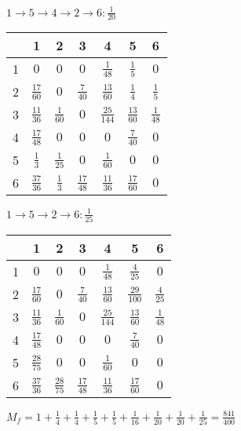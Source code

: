 \documentclass[russian]{article}
\begin{document}
$ 1 \to 5 \to 4 \to 2 \to 6 : \frac{1}{20}$

\begin{tabular}{|c|c|c|c|c|c|c|}\hline
& 1& 2& 3& 4& 5& 6\\\hline
1& $0$& $0$& $0$& $\frac{1}{48}$& $\frac{1}{5}$& $0$\\\hline
2& $\frac{17}{60}$& $0$& $\frac{7}{40}$& $\frac{13}{60}$& $\frac{1}{4}$& $\frac{1}{5}$\\\hline
3& $\frac{11}{36}$& $\frac{1}{60}$& $0$& $\frac{25}{144}$& $\frac{13}{60}$& $\frac{1}{48}$\\\hline
4& $\frac{17}{48}$& $0$& $0$& $0$& $\frac{7}{40}$& $0$\\\hline
5& $\frac{1}{3}$& $\frac{1}{25}$& $0$& $\frac{1}{60}$& $0$& $0$\\\hline
6& $\frac{37}{36}$& $\frac{1}{3}$& $\frac{17}{48}$& $\frac{11}{36}$& $\frac{17}{60}$& $0$\\\hline
\end{tabular}

$ 1 \to 5 \to 2 \to 6 : \frac{1}{25}$

\begin{tabular}{|c|c|c|c|c|c|c|}\hline
& 1& 2& 3& 4& 5& 6\\\hline
1& $0$& $0$& $0$& $\frac{1}{48}$& $\frac{4}{25}$& $0$\\\hline
2& $\frac{17}{60}$& $0$& $\frac{7}{40}$& $\frac{13}{60}$& $\frac{29}{100}$& $\frac{4}{25}$\\\hline
3& $\frac{11}{36}$& $\frac{1}{60}$& $0$& $\frac{25}{144}$& $\frac{13}{60}$& $\frac{1}{48}$\\\hline
4& $\frac{17}{48}$& $0$& $0$& $0$& $\frac{7}{40}$& $0$\\\hline
5& $\frac{28}{75}$& $0$& $0$& $\frac{1}{60}$& $0$& $0$\\\hline
6& $\frac{37}{36}$& $\frac{28}{75}$& $\frac{17}{48}$& $\frac{11}{36}$& $\frac{17}{60}$& $0$\\\hline
\end{tabular}

$M_f=1+\frac{1}{4}+\frac{1}{4}+\frac{1}{5}+\frac{1}{5}+\frac{1}{16}+\frac{1}{20}+\frac{1}{20}+\frac{1}{25}=\frac{841}{400}$
\end{document}
